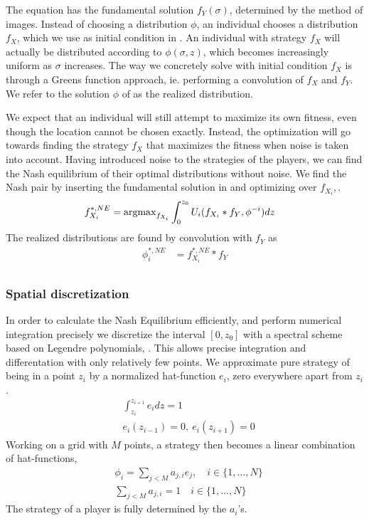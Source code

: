  The equation  has the fundamental solution $f_Y(\sigma)$, determined by the method of images. Instead of choosing a distribution $\phi$, an individual chooses a distribution $f_X$, which we use as initial condition in . An individual with strategy $f_X$ will actually be distributed according to $\phi(\sigma,z)$, which becomes increasingly uniform as $\sigma$ increases. The way we concretely solve  with initial condition $f_X$ is through a Greens function approach, ie. performing a convolution of $f_X$ and $f_Y$.  We refer to the solution $\phi$ of  as the realized distribution.

We expect that an individual will still attempt to maximize its own fitness, even though the location cannot be chosen exactly. Instead, the optimization will go towards finding the strategy $f_X$ that maximizes the fitness when noise is taken into account.
Having introduced noise to the strategies of the players, we can find the Nash equilibrium of their optimal distributions without noise. We find the Nash pair by inserting the fundamental solution in  and optimizing over $f_{X_i},$.
\begin{align*}
	f_{X_i}^{*,NE} &=  \argmax_{f_{X_i}}  \int_0^{z_0} U_i(f_{X_i}*f_Y, \phi^{-i}) dz
\end{align*}
The realized distributions are found by convolution with $f_Y$ as
\begin{align*}
  \phi_i^{*,NE} &= f_{X_i}^{*,NE} * f_Y \\
\end{align*}

\subsubsection*{Spatial discretization}
In order to calculate the Nash Equilibrium efficiently, and perform numerical integration precisely we discretize the interval $[0,z_0]$ with a spectral scheme based on Legendre polynomials, \citep{kopriva2009implementing}. This allows precise integration and differentation with only relatively few points.
We approximate pure strategy of being in a point $z_i$  by a normalized hat-function $e_i$, zero everywhere apart from $z_i$.
\begin{align*}
	& \int_{z_i}^{z_{i+1}} e_i dz = 1 \\
	&e_i(z_{i-1}) = 0,~ e_i(z_{i+1}) = 0
\end{align*}
Working on a grid with $M$ points, a strategy then becomes a linear combination of hat-functions,
\begin{align*}
  &\phi_{i} = \sum_{j<M} a_{j,i} e_j, \quad i\in \{1,\dots, N\} \\
  &\sum_{j<M} a_{j,i} = 1 \quad i\in \{1,\dots, N\}
\end{align*}
The strategy of a player is fully determined by the $a_i$'s.

